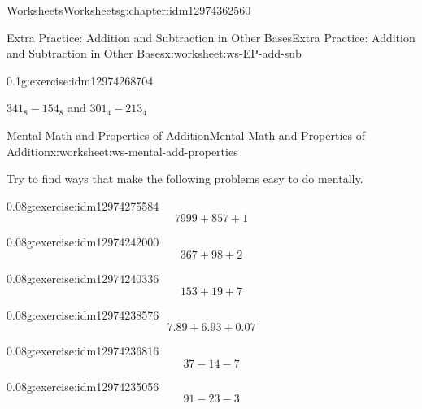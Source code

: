 \documentclass[twoside,11pt,]{book}
\begin{document}
\begin{chapterptx}{Worksheets}{}{Worksheets}{}{}{g:chapter:idm12974362560}
\begin{worksheet-section-numberless}{Extra Practice: Addition and Subtraction in Other Bases}{}{Extra Practice: Addition and Subtraction in Other Bases}{}{}{x:worksheet:ws-EP-add-sub}
\begin{divisionexercise}{2}{}{0.1}{g:exercise:idm12974268704}
\par
\(341_8 - 154_8 \) and \(301_4 -213_4\)%
\end{divisionexercise}%
\end{worksheet-section-numberless}
\restoregeometry
%
%
\typeout{************************************************}
\typeout{************************************************}
%
\begin{worksheet-section-numberless}{Mental Math and Properties of Addition}{}{Mental Math and Properties of Addition}{}{}{x:worksheet:ws-mental-add-properties}
\begin{introduction}{}%
Try to find ways that make the following problems easy to do mentally.%
\end{introduction}%
\begin{divisionexercise}{1}{}{0.08}{g:exercise:idm12974275584}%
%
\begin{equation*}
7999+857+1
\end{equation*}
%
\end{divisionexercise}%
\begin{divisionexercise}{2}{}{0.08}{g:exercise:idm12974242000}%
%
\begin{equation*}
367+98+2
\end{equation*}
%
\end{divisionexercise}%
\begin{divisionexercise}{3}{}{0.08}{g:exercise:idm12974240336}%
%
\begin{equation*}
153+19+7
\end{equation*}
%
\end{divisionexercise}%
\begin{divisionexercise}{4}{}{0.08}{g:exercise:idm12974238576}%
%
\begin{equation*}
7.89+6.93+0.07
\end{equation*}
%
\end{divisionexercise}%
\begin{divisionexercise}{5}{}{0.08}{g:exercise:idm12974236816}%
%
\begin{equation*}
37-14-7
\end{equation*}
%
\end{divisionexercise}%
\begin{divisionexercise}{6}{}{0.08}{g:exercise:idm12974235056}%
%
\begin{equation*}
91-23-3
\end{equation*}

\end{divisionexercise}
\end{worksheet-section-numberless}
\end{chapterptx}
\end{document}
